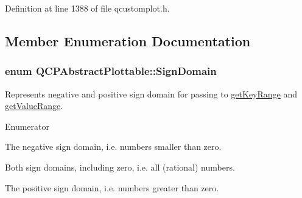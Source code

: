

Definition at line 1388 of file qcustomplot.\+h.



\subsection{Member Enumeration Documentation}
\hypertarget{class_q_c_p_abstract_plottable_a661743478a1d3c09d28ec2711d7653d8}{}
\subsubsection[{Sign\+Domain}]{\setlength{\rightskip}{0pt plus 5cm}enum {\bf Q\+C\+P\+Abstract\+Plottable\+::\+Sign\+Domain}\hspace{0.3cm}{\ttfamily [protected]}}\label{class_q_c_p_abstract_plottable_a661743478a1d3c09d28ec2711d7653d8}
Represents negative and positive sign domain for passing to \hyperlink{class_q_c_p_abstract_plottable_a345d702b2e7e12c8cfdddff65ba85e8c}{get\+Key\+Range} and \hyperlink{class_q_c_p_abstract_plottable_aa3331b415b5939fe4df60b78831b2799}{get\+Value\+Range}. \begin{Desc}
\item[Enumerator]\par
\begin{description}
\item[{\em 
\hypertarget{class_q_c_p_abstract_plottable_a661743478a1d3c09d28ec2711d7653d8a0fc9a70796ef60ad18ddd18056e6dc63}{}sd\+Negative\label{class_q_c_p_abstract_plottable_a661743478a1d3c09d28ec2711d7653d8a0fc9a70796ef60ad18ddd18056e6dc63}
}]The negative sign domain, i.\+e. numbers smaller than zero. \item[{\em 
\hypertarget{class_q_c_p_abstract_plottable_a661743478a1d3c09d28ec2711d7653d8a082b98cfb91a7363a3b5cd17b0c1cd60}{}sd\+Both\label{class_q_c_p_abstract_plottable_a661743478a1d3c09d28ec2711d7653d8a082b98cfb91a7363a3b5cd17b0c1cd60}
}]Both sign domains, including zero, i.\+e. all (rational) numbers. \item[{\em 
\hypertarget{class_q_c_p_abstract_plottable_a661743478a1d3c09d28ec2711d7653d8a02951859f243a4d24e779cfbb5471030}{}sd\+Positive\label{class_q_c_p_abstract_plottable_a661743478a1d3c09d28ec2711d7653d8a02951859f243a4d24e779cfbb5471030}
}]The positive sign domain, i.\+e. numbers greater than zero. \end{description}
\end{Desc}


